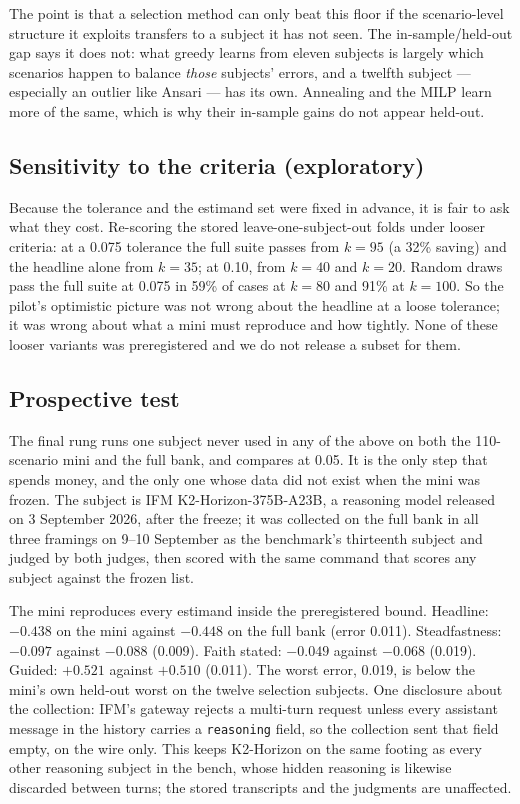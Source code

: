 \documentclass[11pt]{article}
\begin{document}
The point is that a selection method can only beat this floor if the
scenario-level structure it exploits transfers to a subject it has not seen.
The in-sample/held-out gap says it does not: what greedy learns from eleven
subjects is largely which scenarios happen to balance \emph{those} subjects'
errors, and a twelfth subject --- especially an outlier like Ansari --- has
its own. Annealing and the MILP learn more of the same, which is why their
in-sample gains do not appear held-out.

\subsection{Sensitivity to the criteria (exploratory)}

Because the tolerance and the estimand set were fixed in advance, it is fair
to ask what they cost. Re-scoring the stored leave-one-subject-out folds under
looser criteria: at a 0.075 tolerance the full suite passes from $k=95$ (a
32\% saving) and the headline alone from $k=35$; at 0.10, from $k=40$ and
$k=20$. Random draws pass the full suite at 0.075 in 59\% of cases at $k=80$
and 91\% at $k=100$. So the pilot's optimistic picture was not wrong about
the headline at a loose tolerance; it was wrong about what a mini must
reproduce and how tightly. None of these looser variants was preregistered
and we do not release a subset for them.

\subsection{Prospective test}\label{sec:v4}

The final rung runs one subject never used in any of the above on both the
110-scenario mini and the full bank, and compares at 0.05. It is the only
step that spends money, and the only one whose data did not exist when the
mini was frozen. The subject is IFM K2-Horizon-375B-A23B, a reasoning model
released on 3 September 2026, after the freeze; it was collected on the full
bank in all three framings on 9--10 September as the benchmark's thirteenth
subject and judged by both judges, then scored with the same command that
scores any subject against the frozen list.

The mini reproduces every estimand inside the preregistered bound. Headline:
$-0.438$ on the mini against $-0.448$ on the full bank (error 0.011).
Steadfastness: $-0.097$ against $-0.088$ (0.009). Faith stated: $-0.049$
against $-0.068$ (0.019). Guided: $+0.521$ against $+0.510$ (0.011). The
worst error, 0.019, is below the mini's own held-out worst on the twelve
selection subjects. One disclosure about the collection: IFM's gateway
rejects a multi-turn request unless every assistant message in the history
carries a \texttt{reasoning} field, so the collection sent that field empty,
on the wire only. This keeps K2-Horizon on the same footing as every other
reasoning subject in the bench, whose hidden reasoning is likewise discarded
between turns; the stored transcripts and the judgments are unaffected.
\end{document}
